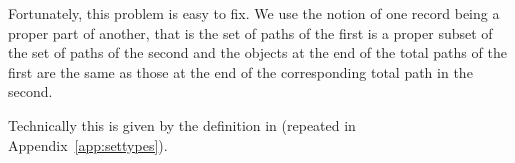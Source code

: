 Fortunately, this problem is easy to fix.  We use the notion of one
record being a proper part of another, that is the set of paths of the
first is a proper subset of the set of paths of the second and the
objects at the end of the total paths of the first are the same as
those at the end of the corresponding total path in the second.
\begin{shaded}
Technically this is given by
the definition in \nexteg{} (repeated in Appendix~\ref{app:settypes}).  %
 

 

\end{shaded}
